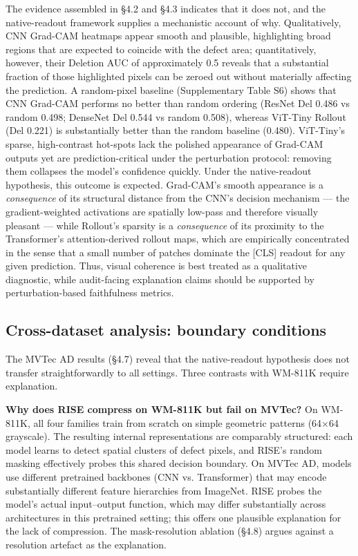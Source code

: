\documentclass[11pt,a4paper]{article}
\begin{document}
The evidence assembled in \S{}4.2 and \S{}4.3 indicates that it does not, and the native-readout framework supplies a mechanistic account of why. Qualitatively, CNN Grad-CAM heatmaps appear smooth and plausible, highlighting broad regions that are expected to coincide with the defect area; quantitatively, however, their Deletion AUC of approximately 0.5 reveals that a substantial fraction of those highlighted pixels can be zeroed out without materially affecting the prediction. A random-pixel baseline (Supplementary Table S6) shows that CNN Grad-CAM performs no better than random ordering (ResNet Del 0.486 vs random 0.498; DenseNet Del 0.544 vs random 0.508), whereas ViT-Tiny Rollout (Del 0.221) is substantially better than the random baseline (0.480). ViT-Tiny's sparse, high-contrast hot-spots lack the polished appearance of Grad-CAM outputs yet are prediction-critical under the
perturbation protocol: removing them collapses the model's confidence quickly. Under the native-readout hypothesis, this outcome is expected. Grad-CAM's smooth appearance is a \emph{consequence} of its structural distance from the CNN's decision mechanism --- the gradient-weighted activations are spatially low-pass and therefore visually pleasant --- while Rollout's sparsity is a \emph{consequence} of its proximity to the Transformer's attention-derived rollout maps, which are empirically concentrated in the sense that a small number of patches dominate the [CLS] readout for any given prediction. Thus, visual coherence is best treated as a qualitative diagnostic, while audit-facing explanation claims should be supported by perturbation-based faithfulness metrics.

\subsection{Cross-dataset analysis: boundary conditions}

The MVTec AD results (\S{}4.7) reveal that the native-readout hypothesis does not transfer straightforwardly to all settings. Three contrasts with WM-811K require explanation.

\textbf{Why does RISE compress on WM-811K but fail on MVTec?} On WM-811K, all four families train from scratch on simple geometric patterns (64$\times$64 grayscale). The resulting internal representations are comparably structured: each model learns to detect spatial clusters of defect pixels, and RISE's random masking effectively probes this shared decision boundary. On MVTec AD, models use different pretrained backbones (CNN vs. Transformer) that may encode substantially different feature hierarchies from ImageNet. RISE probes the model's actual input--output function, which may differ substantially across architectures in this pretrained setting; this offers one plausible explanation for the lack of compression. The mask-resolution ablation (\S{}4.8) argues against a resolution artefact as the explanation.
\end{document}
